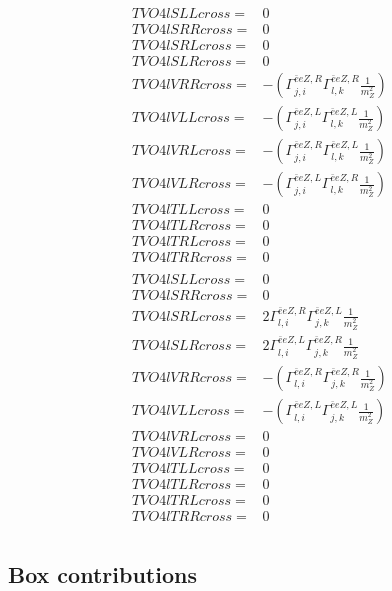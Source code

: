 \documentclass[A4,landscape]{article}
\begin{document}
\begin{align} 
  TVO4lSLLcross= & 0 \\ 
  TVO4lSRRcross= & 0 \\ 
  TVO4lSRLcross= & 0 \\ 
  TVO4lSLRcross= & 0 \\ 
  TVO4lVRRcross= & -(\Gamma^{\bar{e}e Z ,R}_{j, i} \Gamma^{\bar{e}e Z ,R}_{l, k} \frac{1}{m^2_{Z}}) \\ 
  TVO4lVLLcross= & -(\Gamma^{\bar{e}e Z ,L}_{j, i} \Gamma^{\bar{e}e Z ,L}_{l, k} \frac{1}{m^2_{Z}}) \\ 
  TVO4lVRLcross= & -(\Gamma^{\bar{e}e Z ,R}_{j, i} \Gamma^{\bar{e}e Z ,L}_{l, k} \frac{1}{m^2_{Z}}) \\ 
  TVO4lVLRcross= & -(\Gamma^{\bar{e}e Z ,L}_{j, i} \Gamma^{\bar{e}e Z ,R}_{l, k} \frac{1}{m^2_{Z}}) \\ 
  TVO4lTLLcross= & 0 \\ 
  TVO4lTLRcross= & 0 \\ 
  TVO4lTRLcross= & 0 \\ 
  TVO4lTRRcross= & 0 \\ 
\end{align} 
\begin{align} 
  TVO4lSLLcross= & 0 \\ 
  TVO4lSRRcross= & 0 \\ 
  TVO4lSRLcross= & 2 \Gamma^{\bar{e}e Z ,R}_{l, i} \Gamma^{\bar{e}e Z ,L}_{j, k} \frac{1}{m^2_{Z}} \\ 
  TVO4lSLRcross= & 2 \Gamma^{\bar{e}e Z ,L}_{l, i} \Gamma^{\bar{e}e Z ,R}_{j, k} \frac{1}{m^2_{Z}} \\ 
  TVO4lVRRcross= & -(\Gamma^{\bar{e}e Z ,R}_{l, i} \Gamma^{\bar{e}e Z ,R}_{j, k} \frac{1}{m^2_{Z}}) \\ 
  TVO4lVLLcross= & -(\Gamma^{\bar{e}e Z ,L}_{l, i} \Gamma^{\bar{e}e Z ,L}_{j, k} \frac{1}{m^2_{Z}}) \\ 
  TVO4lVRLcross= & 0 \\ 
  TVO4lVLRcross= & 0 \\ 
  TVO4lTLLcross= & 0 \\ 
  TVO4lTLRcross= & 0 \\ 
  TVO4lTRLcross= & 0 \\ 
  TVO4lTRRcross= & 0 \\ 
\end{align} 
\subsection{Box contributions} 
\end{document}
